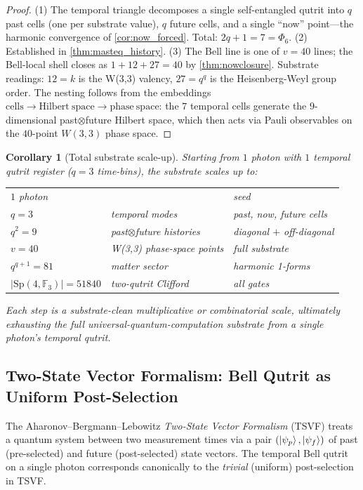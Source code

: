 ﻿\documentclass[12pt]{article}
\newtheorem{corollary}[theorem]{Corollary}
\newcommand{\Sp}{\mathrm{Sp}}
\newcommand{\GF}[1]{\mathbb{F}_{#1}}
\begin{document}
\begin{proof}
(1) The temporal triangle decomposes a single self-entangled qutrit into $q$
past cells (one per substrate value), $q$ future cells, and a single
``now'' point---the harmonic convergence of \cref{cor:now_forced}.  Total:
$2q + 1 = 7 = \Phi_6$.
(2) Established in \cref{thm:masteq_history}.
(3) The Bell line is one of $v = 40$ lines; the Bell-local shell closes as
$1 + 12 + 27 = 40$ by \cref{thm:nowclosure}.  Substrate readings:
$12 = k$ is the W(3,3) valency, $27 = q^q$ is the Heisenberg-Weyl group
order.
The nesting follows from the embeddings $\mathrm{cells} \to
\mathrm{Hilbert\ space} \to \mathrm{phase\ space}$: the $7$ temporal cells
generate the $9$-dimensional past$\otimes$future Hilbert space, which then
acts via Pauli observables on the $40$-point $W(3,3)$ phase space.
\end{proof}

\begin{corollary}[Total substrate scale-up]\label{cor:scaleup}
Starting from $1$ photon with $1$ temporal qutrit register ($q = 3$ time-bins),
the substrate scales up to:
\begin{center}\begin{tabular}{lll}
$1$ photon &           & seed \\
$q = 3$    & temporal modes & past, now, future cells \\
$q^2 = 9$  & past$\otimes$future histories & diagonal $+$ off-diagonal \\
$v = 40$   & W(3,3) phase-space points & full substrate \\
$q^{q+1} = 81$ & matter sector & harmonic 1-forms \\
$|\Sp(4,\GF{3})| = 51840$ & two-qutrit Clifford & all gates \\
\end{tabular}\end{center}
Each step is a substrate-clean multiplicative or combinatorial scale,
ultimately exhausting the full universal-quantum-computation substrate from
a single photon's temporal qutrit.
\end{corollary}

\subsection{Two-State Vector Formalism: Bell Qutrit as Uniform Post-Selection}
\label{sec:tsvf}

The Aharonov--Bergmann--Lebowitz \emph{Two-State Vector Formalism} (TSVF)
\cite{ABL1964,AharonovVaidman1991} treats a quantum system between two
measurement times via a pair $(\ket{\psi_p}, \ket{\psi_f})$ of past
(pre-selected) and future (post-selected) state vectors.  The temporal
Bell qutrit on a single photon corresponds canonically to the
\emph{trivial} (uniform) post-selection in TSVF.
\end{document}
